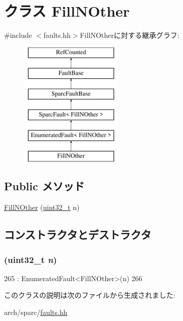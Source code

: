 \hypertarget{classSparcISA_1_1FillNOther}{
\section{クラス FillNOther}
\label{classSparcISA_1_1FillNOther}
}


{\ttfamily \#include $<$faults.hh$>$}FillNOtherに対する継承グラフ:\begin{figure}[H]
\begin{center}
\leavevmode
\includegraphics[height=6cm]{classSparcISA_1_1FillNOther}
\end{center}
\end{figure}
\subsection*{Public メソッド}
\begin{DoxyCompactItemize}
\item 
\hyperlink{classSparcISA_1_1FillNOther_a364cb0a1b7e752796331e0e50e452302}{FillNOther} (\hyperlink{Type_8hh_a435d1572bf3f880d55459d9805097f62}{uint32\_\-t} n)
\end{DoxyCompactItemize}


\subsection{コンストラクタとデストラクタ}
\hypertarget{classSparcISA_1_1FillNOther_a364cb0a1b7e752796331e0e50e452302}{
\subsubsection[{FillNOther}]{ ({\bf uint32\_\-t} {\em n})}}
\label{classSparcISA_1_1FillNOther_a364cb0a1b7e752796331e0e50e452302}



\begin{DoxyCode}
265                            : EnumeratedFault<FillNOther>(n)
266     {}
\end{DoxyCode}


このクラスの説明は次のファイルから生成されました:\begin{DoxyCompactItemize}
\item 
arch/sparc/\hyperlink{arch_2sparc_2faults_8hh}{faults.hh}\end{DoxyCompactItemize}
